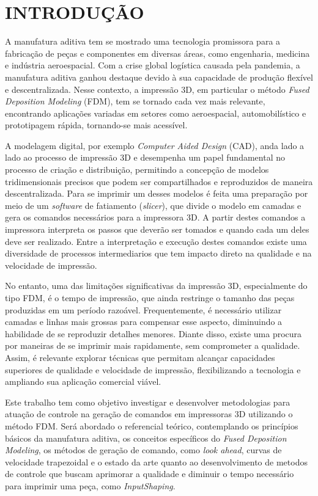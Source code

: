 \chapter{INTRODUÇÃO}
A manufatura aditiva tem se mostrado uma tecnologia promissora para a fabricação de peças e componentes em
diversas áreas, como engenharia, medicina e indústria aeroespacial. Com a crise global logística causada
pela pandemia, a manufatura aditiva ganhou destaque devido à sua capacidade de produção flexível e 
descentralizada. Nesse contexto, a impressão 3D, em particular o método 
\textit{Fused Deposition Modeling} (FDM), tem se tornado cada vez mais relevante, encontrando aplicações 
variadas em setores como aeroespacial, automobilístico e prototipagem rápida, tornando-se mais acessível.

A modelagem digital, por exemplo \textit{Computer Aided Design} (CAD), anda lado a lado ao processo de impressão 3D
e desempenha um papel fundamental no processo de criação e distribuição, permitindo a concepção de modelos 
tridimensionais precisos que podem ser compartilhados e reproduzidos de maneira descentralizada. 
Para se imprimir um desses modelos é feita uma preparação por meio de um \textit{software} de fatiamento 
(\textit{slicer}), que divide o modelo em camadas e gera os comandos necessários para a impressora 3D. 
A partir destes comandos a impressora interpreta os passos que deverão ser tomados e quando cada um deles 
deve ser realizado. Entre a interpretação e execução destes comandos existe uma diversidade de processos 
intermediarios que tem impacto direto na qualidade e na velocidade de impressão.

No entanto, uma das limitações significativas da impressão 3D, especialmente do tipo FDM, é o tempo de 
impressão, que ainda restringe o tamanho das peças produzidas em um período razoável. Frequentemente, é 
necessário utilizar camadas e linhas mais grossas para compensar esse aspecto, diminuindo a habilidade de
se reproduzir detalhes menores. Diante disso, existe uma procura por maneiras de se imprimir mais rapidamente, 
sem comprometer a qualidade.
Assim, é relevante explorar técnicas que permitam alcançar capacidades superiores de qualidade e 
velocidade de impressão, flexibilizando a tecnologia e ampliando sua aplicação comercial viável. 

Este trabalho tem como objetivo investigar e desenvolver metodologias para atuação de controle na geração de
comandos em impressoras 3D utilizando o método FDM. Será abordado o referencial teórico, contemplando os 
princípios básicos da manufatura aditiva, os conceitos específicos do \textit{Fused Deposition Modeling}, 
os métodos de geração de comando, como \textit{look ahead}, curvas de velocidade trapezoidal e o estado da 
arte quanto ao desenvolvimento de metodos de controle que buscam aprimorar a qualidade e diminuir o tempo 
necessário para imprimir uma peça, como \textit{InputShaping}.

